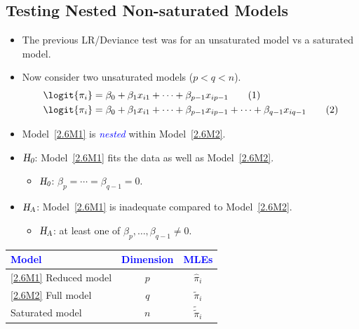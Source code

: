 \documentclass{article}\usepackage[]{graphicx}\usepackage[svgnames]{xcolor}
\newcommand{\HN}{\textsl{H}_{\textsl{0}}}%
\newcommand{\HA}{\textsl{H}_{\textsl{A}}}%
\begin{document}
\subsection*{Testing Nested Non-saturated Models}
\begin{itemize}
      \item The previous LR/Deviance test was for an unsaturated model vs a saturated model.
      \item Now consider two unsaturated models ($ p<q<n $).
            \begin{align*}
                  \logit{\pi_i} & =\beta_0+\beta_1x_{i1}+\cdots+\beta_{p-1}x_{ip-1}\tag*{(1)}\label{2.6M1}                            \\
                  \logit{\pi_i} & =\beta_0+\beta_1x_{i1}+\cdots+\beta_{p-1}x_{ip-1}+\cdots+\beta_{q-1}x_{iq-1}\tag*{(2)}\label{2.6M2}
            \end{align*}
      \item Model~\ref{2.6M1} is \textcolor{Blue}{\emph{nested}} within Model~\ref{2.6M2}.
      \item $ \HN $: Model~\ref{2.6M1} fits the data as well as Model~\ref{2.6M2}.
            \begin{itemize}
                  \item $ \HN $: $ \beta_p=\cdots=\beta_{q-1}=0 $.
            \end{itemize}
      \item $ \HA $: Model~\ref{2.6M1} is inadequate compared to Model~\ref{2.6M2}.
            \begin{itemize}
                  \item $ \HA $: at least one of $ \beta_p,\ldots,\beta_{q-1}\ne 0 $.
            \end{itemize}
\end{itemize}
\begin{table}[!htbp]
      \centering
      \begin{tabular}{lcc}
            \textcolor{Blue}{Model}   & \textcolor{Blue}{Dimension} & \textcolor{Blue}{MLEs}    \\
            \midrule
            \ref{2.6M1} Reduced model & $ p $                       & $ \hat{\pi}_i $           \\
            \ref{2.6M2} Full model    & $ q $                       & $ \tilde{\pi}_i $         \\
            Saturated model           & $ n $                       & $ \tilde{\tilde{\pi}}_i $ \\
            \bottomrule
      \end{tabular}
\end{table}
\end{document}
